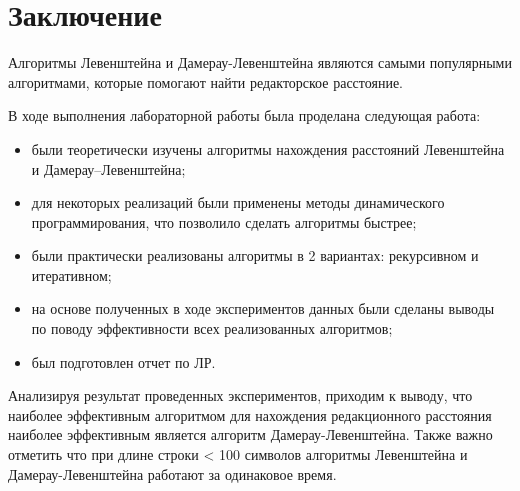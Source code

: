 \chapter*{Заключение}

Алгоритмы Левенштейна и Дамерау-Левенштейна являются самыми популярными алгоритмами, которые помогают найти редакторское расстояние.

В ходе выполнения лабораторной работы была проделана следующая работа:

\begin{itemize}
    \item были теоретически изучены алгоритмы нахождения расстояний Левенштейна и Дамерау--Левенштейна;
	\item для некоторых реализаций были применены методы динамического программирования, что позволило сделать алгоритмы быстрее;
	\item были практически реализованы алгоритмы в 2 вариантах: рекурсивном и итеративном;
	\item на основе полученных в ходе экспериментов данных были сделаны выводы по поводу эффективности всех реализованных алгоритмов;
	\item был подготовлен отчет по ЛР.
\end{itemize}

Анализируя результат проведенных экспериментов, приходим к выводу, что наиболее эффективным алгоритмом для нахождения редакционного расстояния наиболее эффективным является алгоритм Дамерау-Левенштейна. Также важно отметить что при длине строки < 100 символов алгоритмы Левенштейна и Дамерау-Левенштейна работают за одинаковое время.
